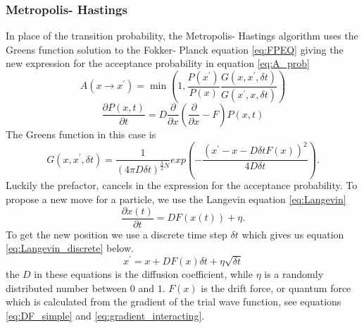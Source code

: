 \documentclass[11pt,a4paper,titlepage]{article}
\begin{document}
\subsubsection{Metropolis- Hastings}
In place of the transition probability, the Metropolis- Hastings algorithm uses the Greens function solution to the Fokker- Planck equation \eqref{eq:FPEQ}  giving the new expression for the acceptance probability in equation \eqref{eq:A_prob}
\begin{equation}
A\left(x\rightarrow x^{\prime}\right)=\min \left(1, \frac{P\left(x^{\prime}\right)}{P\left(x\right)} \frac{G\left(x,x^{\prime},\delta t\right)}{G\left(x^{\prime},x,\delta t\right)}\right)\label{eq:A_prob}
\end{equation}
\begin{equation}
\frac{\partial P(x, t)}{\partial t}=D \frac{\partial}{\partial x}\left(\frac{\partial}{\partial x}-F\right) P(x, t)\label{eq:FPEQ}
\end{equation}
The Greens function in this case is 
\begin{equation}
G\left(x,x^{\prime},\delta t\right) = \frac{1}{(4\pi D\delta t)^{\frac{3}{2}N}} exp{\left( -\frac{\left( x^{\prime}-x-D\delta t F(x) \right)^2}{4D\delta t} \right)}.\label{eq:green}
\end{equation}
Luckily the prefactor, cancels in the expression for the acceptance probability. To propose a new move for a particle, we use the Langevin equation \eqref{eq:Langevin}
\begin{equation}
\frac{\partial x(t)}{\partial t}=D F(x(t))+\eta.\label{eq:Langevin}
\end{equation}
To get the new position we use a discrete time step $\delta t $
which gives us equation \eqref{eq:Langevin_discrete} below.
\begin{equation}
x^{\prime} = x + DF(x)\delta t + \eta \sqrt{\delta t}\label{eq:Langevin_discrete}
\end{equation}
the $D$ in these equations is the diffusion coefficient, while $\eta$ is a randomly distributed number between $0$ and $1$. $F(x)$ is the drift force, or quantum force which is calculated from the gradient of the trial wave function, see equations \eqref{eq:DF_simple} and \eqref{eq:gradient_interacting}. 
\end{document}
